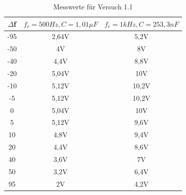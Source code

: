 \documentclass{article}
\begin{document}
\begin{table}[h]
  \begin{center}

    \begin{tabular}{|c|c|c|}
      \hline
      $\Delta$f & $f_r = 500Hz, C=1,01\mu F$ & $f_r = 1kHz, C= 253,3 nF$ \\
      \hline
      -95       & 2,64V                      & 5,2V                      \\
      \hline
      -50       & 4V                         & 8V                        \\
      \hline
      -40       & 4,4V                       & 8,8V                      \\
      \hline
      -20       & 5,04V                      & 10V                       \\
      \hline
      -10       & 5,12V                      & 10,2V                     \\
      \hline
      -5        & 5,12V                      & 10,2V                     \\
      \hline
      0         & 5,04V                      & 10V                       \\
      \hline
      5         & 5,12V                      & 9,6V                      \\
      \hline
      10        & 4,8V                       & 9,4V                      \\
      \hline
      20        & 4,4V                       & 8,6V                      \\
      \hline
      40        & 3,6V                       & 7V                        \\
      \hline
      50        & 3,2V                       & 6,4V                      \\
      \hline
      95        & 2V                         & 4,2V                      \\
      \hline
    \end{tabular}
    \caption{Messwerte für Versuch 1.1}
    \label{tab:MV}
  \end{center}
\end{table}


\newpage
\end{document}
